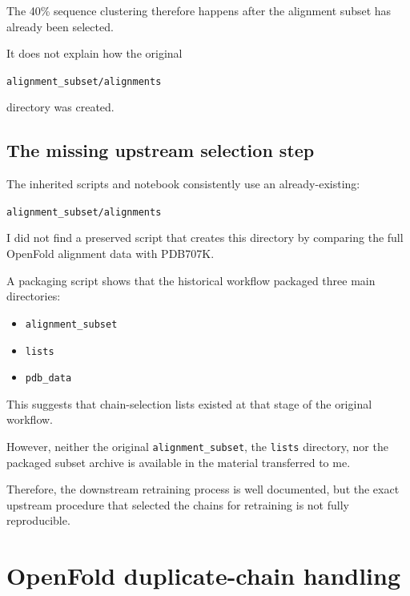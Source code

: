 \documentclass[11pt,a4paper]{article}
\begin{document}
The 40\% sequence clustering therefore happens after the alignment subset has already been selected.

It does not explain how the original

\begin{center}
\texttt{alignment\_subset/alignments}
\end{center}

directory was created.


\subsection{The missing upstream selection step}

The inherited scripts and notebook consistently use an already-existing:

\begin{center}
\texttt{alignment\_subset/alignments}
\end{center}

I did not find a preserved script that creates this directory by comparing the full OpenFold alignment data with PDB707K.

A packaging script shows that the historical workflow packaged three main directories:

\begin{itemize}[leftmargin=*]

    \item \texttt{alignment\_subset}

    \item \texttt{lists}

    \item \texttt{pdb\_data}

\end{itemize}

This suggests that chain-selection lists existed at that stage of the original workflow.

However, neither the original \texttt{alignment\_subset}, the \texttt{lists} directory, nor the packaged subset archive is available in the material transferred to me.

Therefore, the downstream retraining process is well documented, but the exact upstream procedure that selected the chains for retraining is not fully reproducible.


\section{OpenFold duplicate-chain handling}
\end{document}
